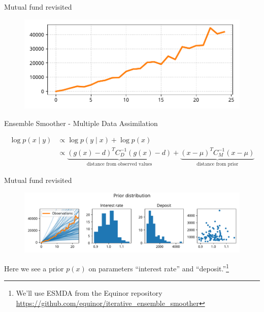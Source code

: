 \documentclass[12pt, aspectratio=149]{beamer}
\theoremstyle{plain}
\begin{document}
\begin{frame}[fragile]{Mutual fund revisited}
\vspace*{-1em}
\begin{center}
 \begin{figure}
    	\centering
    	\includegraphics[width=0.9\linewidth]{figures/esmda_observations.pdf}
 \end{figure}
 \begin{center}
 Ensemble Smoother - Multiple Data Assimilation
 \end{center}
\begin{align*}
\log p(x \mid y) 
&\propto \log p(y \mid x) + \log p(x) \\
&\propto
\underbrace{(g(x) - d)^T C_D^{-1} (g(x) - d)}_{\text{distance from observed values}} +
\underbrace{(x - \mu)^T C_M^{-1} (x - \mu) }_{\text{distance from prior}}
\end{align*}
 \end{center}
\end{frame}

\begin{frame}[fragile]{Mutual fund revisited}
\vspace*{-1em}
\begin{center}
 \begin{figure}
    	\centering
    	\includegraphics[width=0.99\linewidth]{figures/esmda_prior_no_truth.pdf}
 \end{figure}
 Here we see a prior $p(x)$ on parameters ``interest rate'' and ``deposit.''\footnote{We'll use ESMDA from the Equinor repository\\ \href{https://github.com/equinor/iterative_ensemble_smoother}{https://github.com/equinor/iterative\_ensemble\_smoother}}
 \end{center}
\end{frame}
\end{document}
